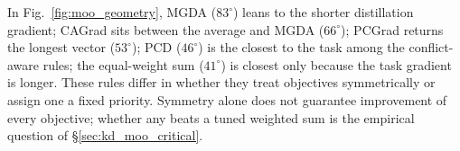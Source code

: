 In Fig.~\ref{fig:moo_geometry}, MGDA ($83^\circ$) leans to the shorter distillation gradient; CAGrad sits between the average and MGDA ($66^\circ$);
PCGrad returns the longest vector ($53^\circ$); PCD ($46^\circ$) is the closest to the task among the conflict-aware
rules; the equal-weight sum ($41^\circ$) is closest only because the task gradient is longer. These rules differ in whether they treat objectives symmetrically or assign one a fixed priority. Symmetry alone does not guarantee improvement of every objective;
whether any beats a tuned weighted sum is the empirical question of \S\ref{sec:kd_moo_critical}.
